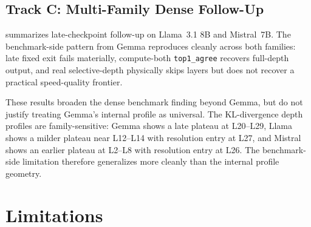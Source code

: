 \documentclass[11pt]{article}
\begin{document}
\subsection{Track C: Multi-Family Dense Follow-Up}

\begin{table}[t]
\centering
\small
\caption{Late-checkpoint dense-family follow-up on the local Apple MLX runtime.}
\label{tab:trackc_multifamily}
\end{table}

 summarizes late-checkpoint follow-up on Llama~3.1 8B and Mistral~7B. The benchmark-side pattern from Gemma reproduces cleanly across both families: late fixed exit fails materially, compute-both \texttt{top1\_agree} recovers full-depth output, and real selective-depth physically skips layers but does not recover a practical speed-quality frontier.

These results broaden the dense benchmark finding beyond Gemma, but do not justify treating Gemma's internal profile as universal. The KL-divergence depth profiles are family-sensitive: Gemma shows a late plateau at L20--L29, Llama shows a milder plateau near L12--L14 with resolution entry at L27, and Mistral shows an earlier plateau at L2--L8 with resolution entry at L26. The benchmark-side limitation therefore generalizes more cleanly than the internal profile geometry.

\section{Limitations}
\end{document}
